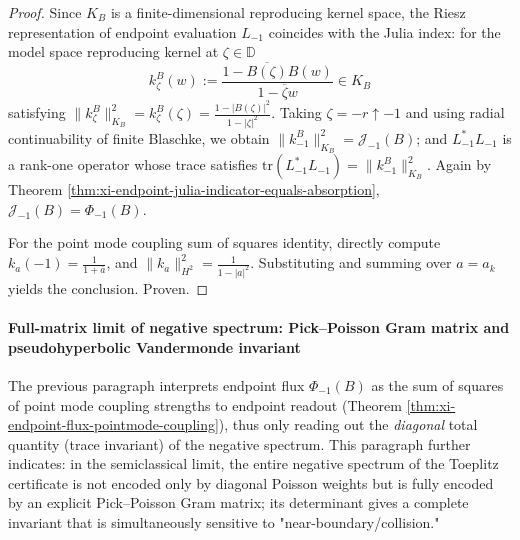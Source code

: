 \begin{proof}
Since \(K_B\) is a finite-dimensional reproducing kernel space, the Riesz representation of endpoint evaluation \(L_{-1}\) coincides with the Julia index: for the model space reproducing kernel at \(\zeta\in\mathbb{D}\)
\[
k_\zeta^B(w):=\frac{1-\overline{B(\zeta)}B(w)}{1-\overline{\zeta}w}\in K_B
\]
satisfying
\(
\|k_\zeta^B\|_{K_B}^2=k_\zeta^B(\zeta)=\frac{1-|B(\zeta)|^2}{1-|\zeta|^2}
\).
Taking \(\zeta=-r\uparrow-1\) and using radial continuability of finite Blaschke, we obtain
\(
\|k_{-1}^B\|_{K_B}^2=\mathcal{J}_{-1}(B)
\);
and \(L_{-1}^\ast L_{-1}\) is a rank-one operator whose trace satisfies
\(
\mathrm{tr}(L_{-1}^\ast L_{-1})=\|k_{-1}^B\|_{K_B}^2
\).
Again by Theorem \ref{thm:xi-endpoint-julia-indicator-equals-absorption}, \(\mathcal{J}_{-1}(B)=\Phi_{-1}(B)\).
\par
For the point mode coupling sum of squares identity, directly compute
\(
k_{a}(-1)=\frac{1}{1+\overline a}
\), and \(\|k_a\|_{H^2}^2=\frac{1}{1-|a|^2}\).
Substituting and summing over \(a=a_k\) yields the conclusion. Proven.
\end{proof}

\paragraph{Full-matrix limit of negative spectrum: Pick--Poisson Gram matrix and pseudohyperbolic Vandermonde invariant}
The previous paragraph interprets endpoint flux \(\Phi_{-1}(B)\) as the sum of squares of point mode coupling strengths to endpoint readout (Theorem \ref{thm:xi-endpoint-flux-pointmode-coupling}), thus only reading out the \emph{diagonal} total quantity (trace invariant) of the negative spectrum.
This paragraph further indicates: in the semiclassical limit, the entire negative spectrum of the Toeplitz certificate is not encoded only by diagonal Poisson weights but is fully encoded by an explicit Pick--Poisson Gram matrix; its determinant gives a complete invariant that is simultaneously sensitive to "near-boundary/collision."

